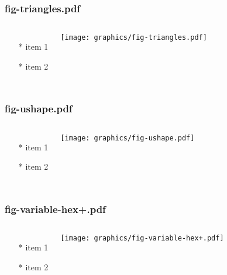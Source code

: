 \documentclass{beamer}
\begin{document}
\begin{frame} \frametitle{fig-triangles.pdf}
    \begin{columns}[c]
        \begin{itemize}
            \item[*] item 1
            \item[*] item 2
        \end{itemize}
        \begin{minipage}{\linewidth}
            \begin{center}
            \texttt{[image: graphics/fig-triangles.pdf]}
            \label{gfx:fig-triangles.pdf}
            \end{center}
        \end{minipage}
    \end{columns}
\end{frame}
\begin{frame} \frametitle{fig-ushape.pdf}
    \begin{columns}[c]
        \begin{itemize}
            \item[*] item 1
            \item[*] item 2
        \end{itemize}
        \begin{minipage}{\linewidth}
            \begin{center}
            \texttt{[image: graphics/fig-ushape.pdf]}
            \label{gfx:fig-ushape.pdf}
            \end{center}
        \end{minipage}
    \end{columns}
\end{frame}
\begin{frame} \frametitle{fig-variable-hex+.pdf}
    \begin{columns}[c]
        \begin{itemize}
            \item[*] item 1
            \item[*] item 2
        \end{itemize}
        \begin{minipage}{\linewidth}
            \begin{center}
            \texttt{[image: graphics/fig-variable-hex+.pdf]}
            \label{gfx:fig-variable-hex+.pdf}
            \end{center}
        \end{minipage}
    \end{columns}
\end{frame}
\end{document}
